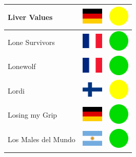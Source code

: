 \documentclass[12pt, a4paper, twoside]{report}
\begin{document}
\begin{center}
\begin{longtable}{|p{5cm}|p{2cm}|p{2cm}|}
 Liver Values                                               & \includegraphics[width=1cm]{../img/flags/de} &   \includegraphics[width=1cm]{../likes/m} \\ \hline
 Lone Survivors                                             & \includegraphics[width=1cm]{../img/flags/fr} &   \includegraphics[width=1cm]{../likes/y} \\ \hline
 Lonewolf                                                   & \includegraphics[width=1cm]{../img/flags/fr} &   \includegraphics[width=1cm]{../likes/y} \\ \hline
 Lordi                                                      & \includegraphics[width=1cm]{../img/flags/fi} &   \includegraphics[width=1cm]{../likes/m} \\ \hline
 Losing my Grip                                             & \includegraphics[width=1cm]{../img/flags/de} &   \includegraphics[width=1cm]{../likes/y} \\ \hline
 Los Males del Mundo                                        & \includegraphics[width=1cm]{../img/flags/ar} &   \includegraphics[width=1cm]{../likes/y} \\ \hline

\end{longtable}
\end{center}
\end{document}
